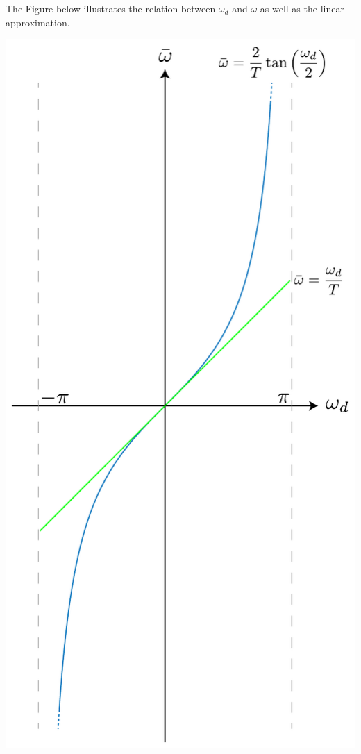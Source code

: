 \documentclass[twoside]{article}
\begin{document}
The Figure below illustrates the relation between $\omega_d$
and $\omega$ as well as the linear approximation. 
%
    \begin{center}
\begin{minipage}[h]{0.4\linewidth}
    \begin{center}
      \includegraphics[width=\textwidth]{bifreq}
    \end{center}
\end{minipage}
    \end{center}
%

\end{document}
